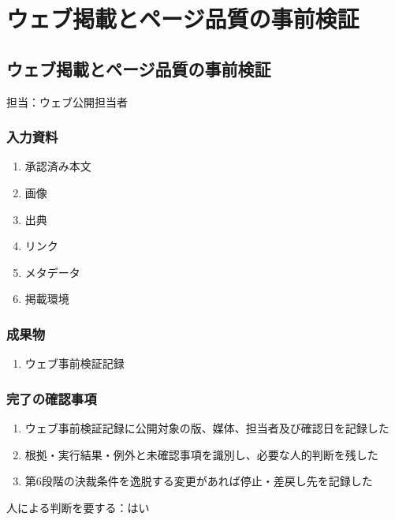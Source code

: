 \documentclass[a4paper,11pt]{article}
\begin{document}
\section{ウェブ掲載とページ品質の事前検証}
\subsection{ウェブ掲載とページ品質の事前検証}
\par 担当：ウェブ公開担当者\par\medskip
\subsubsection*{入力資料}
\begin{enumerate}[leftmargin=2em,itemsep=0.35em]
\item 承認済み本文
\item 画像
\item 出典
\item リンク
\item メタデータ
\item 掲載環境
\end{enumerate}
\subsubsection*{成果物}
\begin{enumerate}[leftmargin=2em,itemsep=0.35em]
\item ウェブ事前検証記録
\end{enumerate}
\subsubsection*{完了の確認事項}
\begin{enumerate}[leftmargin=2em,itemsep=0.35em]
\item ウェブ事前検証記録に公開対象の版、媒体、担当者及び確認日を記録した
\item 根拠・実行結果・例外と未確認事項を識別し、必要な人的判断を残した
\item 第6段階の決裁条件を逸脱する変更があれば停止・差戻し先を記録した
\end{enumerate}
\par 人による判断を要する：はい\par\medskip
\end{document}

